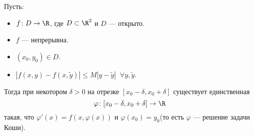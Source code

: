 \begin{theorem}[Пикара]
  Пусть:
  \begin{itemize}
    \item $f\colon D \to \R$, где $D \subset \R^2$ и $D$ --- открыто.
    \item $f$ --- непрерывна.
    \item $(x_0, y_0) \in D$.
    \item $|f(x, y) - f(x, \widetilde{y})| \leqslant M |y - \widetilde{y} | \;\; \forall y, \widetilde{y}$.
  \end{itemize}
  Тогда при некотором $\delta > 0$ на отрезке $[x_0 - \delta, x_0 + \delta]$ существует единственная 
  \begin{equation*}
    \varphi\colon [x_0 - \delta, x_0 + \delta] \to \R
  \end{equation*}
  такая, что $\varphi'(x) = f(x, \varphi(x))$ и $\varphi(x_0) = y_0$(то есть $\varphi$ --- решение задачи Коши).
\end{theorem}
